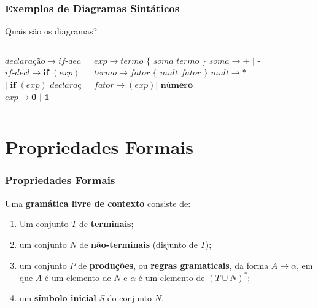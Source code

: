 \documentclass[table]{beamer}
\begin{document}
\begin{frame}
   \frametitle{Exemplos de Diagramas Sintáticos}
   \begin{center}
   Quais são os diagramas?
   \end{center}
   \begin{columns}
      \begin{column}{0.5\textwidth}
        $\textit{declaração} \to \textit{if-decl } | \textbf{ outra}$ \\
	$\textit{if-decl} \to \textbf{if } (\textit{exp}) \textit{ declaração}$ \\
	$ | \textbf{ if } (\textit{exp}) \textit{ declaração} \textbf{ else } \textit{declaração}$  \\
	$ \textit{exp} \to \textbf{0 } | \textbf{ 1}$
      \end{column}
      \begin{column}{0.5\textwidth}
      $\textit{exp} \to \textit{termo } \{\textit{ soma termo } \}$
      $\textit{soma} \to \textbf{+ } | \textbf{ -} $
      $\textit{termo} \to \textit{fator } \{\textit{ mult fator } \}$
      $\textit{mult} \to *$
      $\textit{fator} \to (\textit{exp}) | \textbf{ número}$
      \end{column}
   \end{columns}
\end{frame}

\section{Propriedades Formais}
\begin{frame}
   \frametitle{Propriedades Formais}
   \begin{block}{Uma \textbf{gramática livre de contexto} consiste de:}
      \begin{enumerate}
         \item Um conjunto $T$ de \textbf{terminais};
	 \item um conjunto $N$ de \textbf{não-terminais} (disjunto de $T$);
	 \item um conjunto $P$ de \textbf{produções}, ou \textbf{regras gramaticais}, da forma $A \to \alpha$, em que $A$ é um elemento de $N$ e $\alpha$ é um elemento de $(T \cup N)^{*}$;
	 \item um \textbf{símbolo inicial} $S$ do conjunto $N$.
      \end{enumerate}
   \end{block}
\end{frame}
\end{document}
